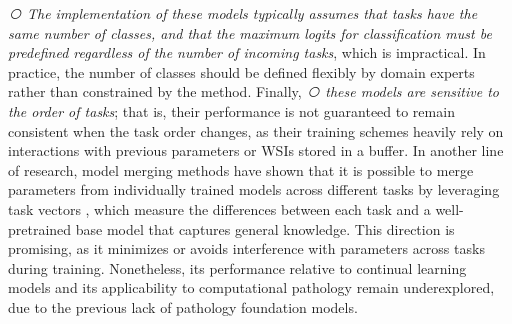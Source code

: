 \documentclass[10pt,twocolumn,letterpaper]{article}
\begin{document}
\textit{\textcircled{} The implementation of these models typically assumes that tasks have the same number of classes, {and that the maximum logits for classification must be predefined regardless of the number of incoming tasks}}, which is impractical. In practice, the number of classes should be defined flexibly by domain experts rather than constrained by the method. Finally, \textit{\textcircled{} these models are sensitive to the order of tasks}; that is, their performance is not guaranteed to remain consistent when the task order changes, as their training schemes heavily rely on interactions with previous parameters or WSIs stored in a buffer. In another line of research, model merging methods \cite{ilharco2022editing,yadav2023ties,tang2024merging} have shown that it is possible to merge parameters from individually trained models across different tasks by leveraging task vectors \cite{ilharco2022editing}, which measure the differences between each task and a well-pretrained base model that captures general knowledge. This direction is promising, as it minimizes or avoids interference with parameters across tasks during training. Nonetheless, its performance relative to continual learning models and its applicability to computational pathology remain underexplored, due to the previous lack of pathology foundation models.
\end{document}
